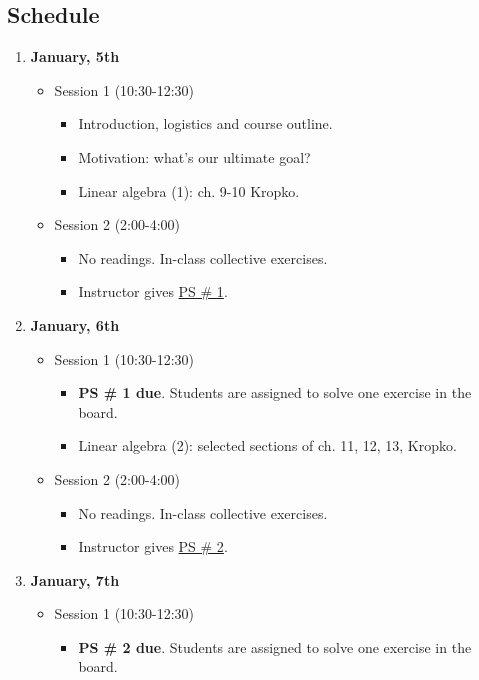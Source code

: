 \documentclass[10pt]{article}
\begin{document}
\subsection*{Schedule}
\begin{enumerate}
\item {\bf January, 5th}
		\begin{itemize}
			\item Session 1 (10:30-12:30)
				\begin{itemize}
				\item Introduction, logistics and course outline.
				\item Motivation: what's our ultimate goal?
				\item Linear algebra (1): ch. 9-10 Kropko.
				\end{itemize}
			\item Session 2 (2:00-4:00)
				\begin{itemize}
				\item No readings. In-class collective exercises.
				\item Instructor gives \href{http://gofile.me/2nH49/lGi5bvDy}{PS \# 1}.
				\end{itemize}
		\end{itemize}
\item  {\bf January, 6th}
		\begin{itemize}
			\item Session 1 (10:30-12:30)
				\begin{itemize}
				\item {\bf PS \# 1 due}. Students are assigned to solve one exercise in the board.
				\item Linear algebra (2): selected sections of ch. 11, 12, 13, Kropko.
				\end{itemize}
			\item Session 2 (2:00-4:00)
				\begin{itemize}
				\item No readings. In-class collective exercises.
				\item Instructor gives \href{http://gofile.me/2nH49/vDBMX2fU}{PS \# 2}.
				\end{itemize}
		\end{itemize}
\item {\bf January, 7th}
		\begin{itemize}
			\item Session 1 (10:30-12:30)
				\begin{itemize}
				\item {\bf PS \# 2 due}. Students are assigned to solve one exercise in the board.

\end{itemize}
\end{itemize}
\end{enumerate}
\end{document}
